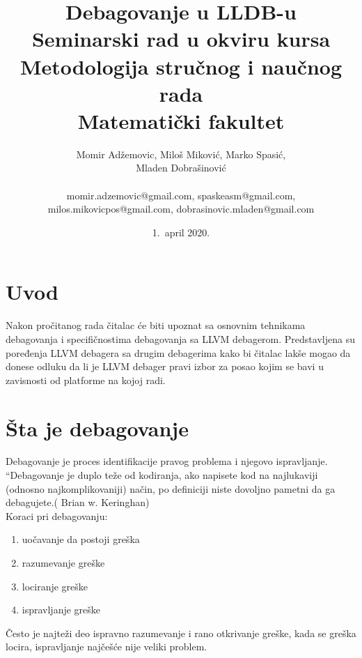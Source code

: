 \documentclass[a4paper]{article}
\begin{document}
\title{Debagovanje u LLDB-u\\ \small{Seminarski rad u okviru kursa\\Metodologija stručnog i naučnog rada\\ Matematički fakultet}}

\author{Momir Adžemovic, Miloš Miković, Marko Spasić,\\ Mladen Dobrašinović\\ \\ \small momir.adzemovic@gmail.com, spaskeasm@gmail.com,\\ \small milos.mikovicpos@gmail.com, dobrasinovic.mladen@gmail.com}

\date{1.~april 2020.}

\maketitle


\tableofcontents

\newpage

\section{Uvod}
\label{sec:uvod}

Nakon pročitanog rada čitalac će biti upoznat sa osnovnim tehnikama debagovanja i specifičnostima debagovanja sa LLVM debagerom. Predstavljena su poređenja LLVM debagera sa drugim debagerima kako bi čitalac lakše mogao da donese odluku da li je LLVM debager pravi izbor za posao kojim se bavi u zavisnosti od platforme na kojoj radi. 


\section{Šta je debagovanje}
\label{sec:sta je debagovanje}

Debagovanje je proces identifikacije pravog problema i njegovo ispravljanje.
“Debagovanje je duplo teže od kodiranja, ako napisete kod na najlukaviji (odnosno najkomplikovaniji) način, po definiciji niste dovoljno pametni da ga debagujete.( Brian w. Keringhan) \cite{debagovanje_vladaf}\\
Koraci pri debagovanju\cite{bagovi_smalkov}:
\begin{enumerate}
\item uočavanje da postoji greška
\item razumevanje greške
\item lociranje greške
\item ispravljanje greške
\end{enumerate}
Često je najteži deo ispravno razumevanje i rano otkrivanje greške, kada se greška locira, ispravljanje najčešće nije veliki problem.
\end{document}
